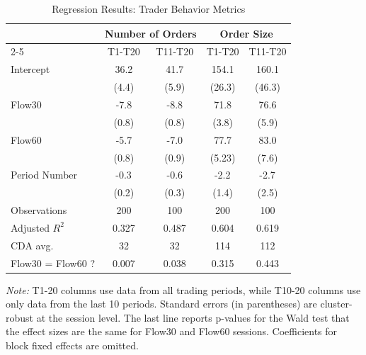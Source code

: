 \documentclass[12pt]{article}
\begin{document}
\begin{table}[H]
\centering    
\caption{Regression Results: Trader Behavior Metrics}
\begin{threeparttable}
\begin{tabular}{@{\extracolsep{5pt}}lcccc}
\toprule
& \multicolumn{2}{c}{Number of Orders} & \multicolumn{2}{c}{Order Size} \\
\cmidrule{2-5}
& T1-T20 & T11-T20 & T1-T20 & T11-T20 \\
\midrule
Intercept & 36.2$ $ & 41.7$ $ & 154.1$ $ & 160.1$ $ \\
  & (4.4) & (5.9) & (26.3) & (46.3) \\
Flow30 & -7.8$ $ & -8.8$ $ & 71.8$ $ & 76.6$ $ \\
  & (0.8) & (0.8) & (3.8) & (5.9) \\
Flow60 & -5.7$ $ & -7.0$ $ & 77.7$ $ & 83.0$ $ \\
  & (0.8) & (0.9) & (5.23) & (7.6) \\
Period Number  & -0.3$^{}$ & -0.6$ $ & -2.2$^{}$ & -2.7$^{}$ \\
  & (0.2) & (0.3) & (1.4) & (2.5) \\
\midrule
Observations & 200 & 100 & 200 & 100 \\
Adjusted $R^2$ & 0.327 & 0.487 & 0.604 & 0.619 \\
\midrule
CDA avg. & 32 & 32 & 114 & 112 \\
Flow30 = Flow60 ? & 0.007 & 0.038 & 0.315 & 0.443 \\ %
\bottomrule
\end{tabular}
\begin{tablenotes}
\footnotesize
\textit{Note:} %
T1-20 columns use data from all trading periods, while T10-20 columns use only data from the last 10 periods.
Standard errors (in parentheses) are cluster-robust at the session level. 
The last line reports p-values for the Wald test that the effect sizes are the same for Flow30 and Flow60 sessions.
Coefficients for block fixed effects are omitted.  
\end{tablenotes}
\end{threeparttable}
\label{tab:TradersBehavior}
\end{table}
\end{document}

